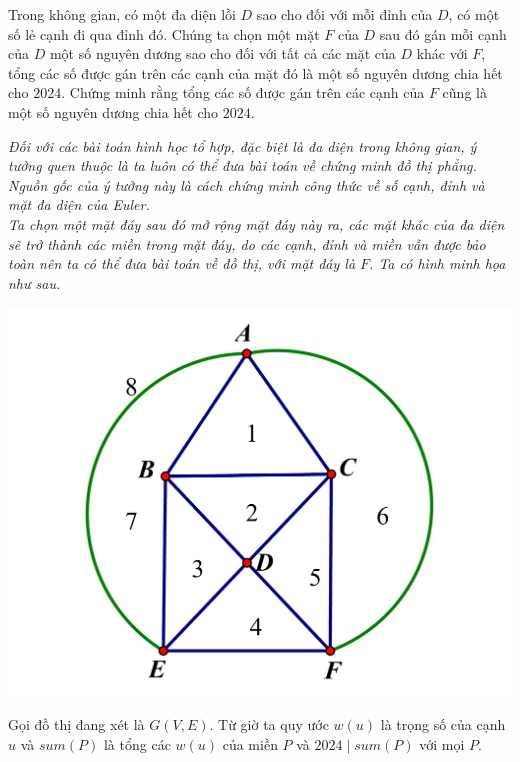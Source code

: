 \documentclass[11pt]{scrartcl}
\begin{document}
\begin{itemize}[label=, leftmargin=0em, itemsep=0.5em]
    \begin{bt}
        Trong không gian, có một đa diện lồi $D$ sao cho đối với mỗi đỉnh của $D$, có một số lẻ cạnh đi qua đỉnh đó. Chúng ta chọn một mặt $F$ của $D$ sau đó gán mỗi cạnh của $D$ một số nguyên dương sao cho đối với tất cả các mặt của $D$ khác với $F$, tổng các số được gán trên các cạnh của mặt đó là một số nguyên dương chia hết cho $2024$. Chứng minh rằng tổng các số được gán trên các cạnh của $F$ cũng là một số nguyên dương chia hết cho $2024$.
    \end{bt}
    \begin{sol}
        \textbf{}\textit{Đối với các bài toán hình học tổ hợp, đặc biệt là đa diện trong không gian, ý tưởng quen thuộc là ta luôn có thể đưa bài toán về chứng minh đồ thị phẳng. Nguồn gốc của ý tưởng này là cách chứng minh công thức về số cạnh, đỉnh và mặt đa diện của Euler.\\
        Ta chọn một mặt đáy sau đó mở rộng mặt đáy này ra, các mặt khác của đa diện sẽ trở thành các miền trong mặt đáy, do các cạnh, đỉnh và miền vẫn được bảo toàn nên ta có thể đưa bài toán về đồ thị, với mặt đáy là $F$. Ta có hình minh họa như sau.}
    
    
    
            \begin{center}
                \includegraphics[scale=0.24]{Image/7.pdf}
            \end{center}

        Gọi đồ thị đang xét là $G(V,E)$. Từ giờ ta quy ước $w(u)$ là trọng số của cạnh $u$ và $sum(P)$ là tổng các $w(u)$ của miền $P$ và $2024 \mid sum(P)$ với mọi $P$.



\end{sol}
\end{itemize}
\end{document}
